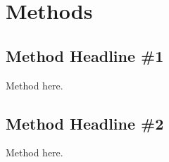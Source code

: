 \section{Methods}

\subsection{Method Headline \#1}
Method here.

\subsection{Method Headline \#2}
Method here.

\label{sec:methods}

